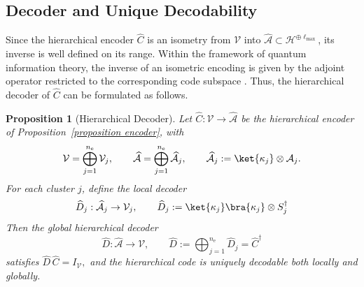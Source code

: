 \documentclass[conference]{IEEEtran}
\newtheorem{proposition}{Proposition}
\begin{document}
\subsection{Decoder and Unique Decodability}
Since the hierarchical encoder $\widehat{C}$ is an isometry from 
$\mathcal{V}$ into $\widehat{\mathcal{A}} \subset \mathcal{H}^{\oplus \ell_{\max}}$, its inverse is well defined on its range. Within the framework of quantum information theory, the inverse of an isometric encoding is given by the adjoint operator restricted to the corresponding code subspace \cite{Wilde_2017}. 
Thus, the hierarchical decoder of $\widehat{C}$ can be formulated as follows.
\begin{proposition}[Hierarchical Decoder]\label{proposition decoder}
Let $\widehat{C} : \mathcal{V} \to \widehat{\mathcal{A}}$ be the hierarchical encoder of Proposition~\ref{proposition encoder}, with
\[
  \mathcal{V} = \bigoplus_{j=1}^{n_{\mathrm{e}}} \mathcal{V}_j,
  \qquad
  \widehat{\mathcal{A}}
    = \bigoplus_{j=1}^{n_{\mathrm{e}}} \widehat{\mathcal{A}}_j,
  \qquad
  \widehat{\mathcal{A}}_j := \ket{\kappa_j} \otimes \mathcal{A}_j.
\]
For each cluster $j$, define the local decoder
\begin{align*}
\widehat{D}_j: \widehat{\mathcal{A}}_j \to \mathcal{V}_j, \qquad 
  \widehat{D}_j
    := \ket{\kappa_j}\bra{\kappa_j} \otimes {S}_j^\dagger    
\end{align*}
Then the global hierarchical decoder
\[
  \widehat{D} : \widehat{\mathcal{A}} \to \mathcal{V}, \qquad
    \widehat{D} := \bigoplus_{j=1}^{n_{\mathrm{e}}} \widehat{D}_j
    = \widehat{C}^\dagger    
\]
satisfies $\widehat{D}\,\widehat{C} = I_{\mathcal{V}},$
and the hierarchical code is uniquely decodable both locally and globally.
\end{proposition}
\end{document}
